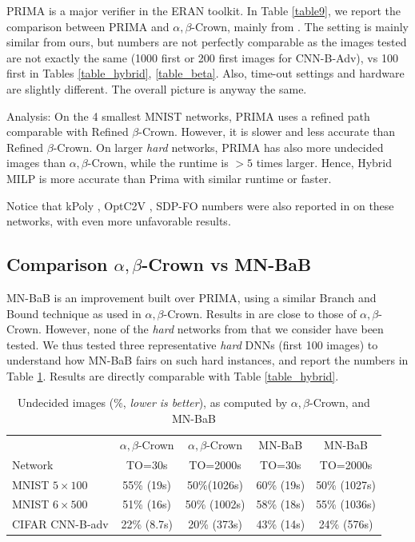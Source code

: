 	PRIMA \cite{prima} is a major verifier in the ERAN toolkit. In Table \ref{table9}, we report the comparison between PRIMA and $\alpha,\beta$-Crown, mainly from \cite{crown}. The setting is mainly similar from ours, but numbers are not perfectly comparable as the images tested are not  exactly the same (1000 first or 200 first images for CNN-B-Adv), vs 100 first in Tables \ref{table_hybrid}, \ref{table_beta}. Also, time-out settings and hardware are slightly different. The overall picture is anyway the same.


Analysis: On the 4 smallest MNIST networks, PRIMA uses a refined path comparable with Refined $\beta$-Crown. However, it is slower and less accurate than Refined $\beta$-Crown.
On larger {\em hard} networks, PRIMA has also more undecided images than $\alpha,\beta$-Crown, while the runtime is $>5$ times larger.
Hence, Hybrid MILP is more accurate than Prima with similar runtime or faster.

Notice that kPoly \cite{kpoly}, OptC2V \cite{optC2V}, SDP-FO \cite{SDPFI} numbers were also reported in \cite{crown} on these networks, with even more unfavorable results.

\subsection*{Comparison $\alpha,\beta$-Crown vs MN-BaB}

MN-BaB \cite{ferrari2022complete} is an improvement built over PRIMA, using a similar Branch and Bound technique as used in $\alpha,\beta$-Crown. Results in \cite{ferrari2022complete}
are close to those of $\alpha,\beta$-Crown. However, none of the {\em hard} networks from \cite{crown} that we consider have been tested. We thus tested three representative {\em hard} DNNs (first 100 images) to understand how MN-BaB fairs on such hard instances, and report the numbers in Table \ref{table10}. Results are directly comparable with Table \ref{table_hybrid}.


\begin{table}[h!]
	\centering
	\begin{tabular}{||l||c|c||c|c||}
		\hline \hline
		 & $\alpha,\beta$-Crown & $\alpha,\beta$-Crown & MN-BaB & MN-BaB \\ 
		 Network & TO=30s & TO=2000s &  TO=30s & TO=2000s \\ 
		\hline
		MNIST $5 \times 100$ & 55\% (19s) & 50\%(1026s) & 60\% (19s) & 50\% (1027s) \\ \hline
		MNIST $6 \times 500$ & 51\% (16s) & 50\% (1002s) & 58\% (18s) & 55\% (1036s) \\ \hline
		CIFAR CNN-B-adv & 22\% (8.7s) & 20\% (373s) & 43\% (14s) & 24\% (576s) \\ \hline 
	\end{tabular}
	\caption{Undecided images ($\%$, {\em lower is better}), as computed by $\alpha,\beta$-Crown, and MN-BaB}
	\label{table10}
\end{table}

